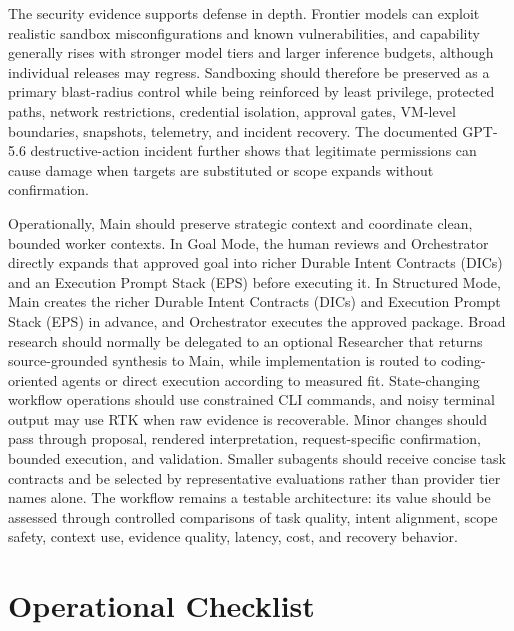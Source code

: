 \documentclass[11pt,a4paper]{article}
\newcommand{\code}[1]{\texttt{\detokenize{#1}}}
\begin{document}
The security evidence supports defense in depth. Frontier models can exploit realistic sandbox misconfigurations and known vulnerabilities, and capability generally rises with stronger model tiers and larger inference budgets, although individual releases may regress. Sandboxing should therefore be preserved as a primary blast-radius control while being reinforced by least privilege, protected paths, network restrictions, credential isolation, approval gates, VM-level boundaries, snapshots, telemetry, and incident recovery. The documented GPT-5.6 destructive-action incident further shows that legitimate permissions can cause damage when targets are substituted or scope expands without confirmation.

Operationally, Main should preserve strategic context and coordinate clean, bounded worker contexts. In Goal Mode, the human reviews \code{GOAL.md} and Orchestrator directly expands that approved goal into richer Durable Intent Contracts (DICs) and an Execution Prompt Stack (EPS) before executing it. In Structured Mode, Main creates the richer Durable Intent Contracts (DICs) and Execution Prompt Stack (EPS) in advance, and Orchestrator executes the approved package. Broad research should normally be delegated to an optional Researcher that returns source-grounded synthesis to Main, while implementation is routed to coding-oriented agents or direct execution according to measured fit. State-changing workflow operations should use constrained CLI commands, and noisy terminal output may use RTK when raw evidence is recoverable. Minor changes should pass through proposal, rendered interpretation, request-specific confirmation, bounded execution, and validation. Smaller subagents should receive concise task contracts and be selected by representative evaluations rather than provider tier names alone. The workflow remains a testable architecture: its value should be assessed through controlled comparisons of task quality, intent alignment, scope safety, context use, evidence quality, latency, cost, and recovery behavior.

\appendix
\section{Operational Checklist}\label{sec:operational-checklist}
\end{document}
